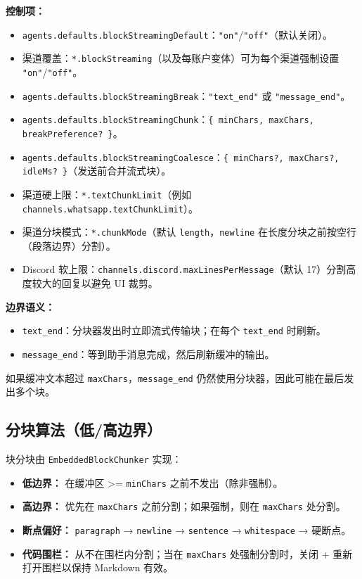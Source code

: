 \textbf{控制项：}

\begin{itemize}
  \item \texttt{agents.defaults.blockStreamingDefault}：\texttt{"on"}/\texttt{"off"}（默认关闭）。
  \item 渠道覆盖：\texttt{*.blockStreaming}（以及每账户变体）可为每个渠道强制设置 \texttt{"on"}/\texttt{"off"}。
  \item \texttt{agents.defaults.blockStreamingBreak}：\texttt{"text\_end"} 或 \texttt{"message\_end"}。
  \item \texttt{agents.defaults.blockStreamingChunk}：\texttt{\{ minChars, maxChars, breakPreference? \}}。
  \item \texttt{agents.defaults.blockStreamingCoalesce}：\texttt{\{ minChars?, maxChars?, idleMs? \}}（发送前合并流式块）。
  \item 渠道硬上限：\texttt{*.textChunkLimit}（例如 \texttt{channels.whatsapp.textChunkLimit}）。
  \item 渠道分块模式：\texttt{*.chunkMode}（默认 \texttt{length}，\texttt{newline} 在长度分块之前按空行（段落边界）分割）。
  \item Discord 软上限：\texttt{channels.discord.maxLinesPerMessage}（默认 17）分割高度较大的回复以避免 UI 裁剪。
\end{itemize}


\textbf{边界语义：}

\begin{itemize}
  \item \texttt{text\_end}：分块器发出时立即流式传输块；在每个 \texttt{text\_end} 时刷新。
  \item \texttt{message\_end}：等到助手消息完成，然后刷新缓冲的输出。
\end{itemize}


如果缓冲文本超过 \texttt{maxChars}，\texttt{message\_end} 仍然使用分块器，因此可能在最后发出多个块。

\subsection{分块算法（低/高边界）}


块分块由 \texttt{EmbeddedBlockChunker} 实现：

\begin{itemize}
  \item \textbf{低边界：} 在缓冲区 >= \texttt{minChars} 之前不发出（除非强制）。
  \item \textbf{高边界：} 优先在 \texttt{maxChars} 之前分割；如果强制，则在 \texttt{maxChars} 处分割。
  \item \textbf{断点偏好：} \texttt{paragraph} → \texttt{newline} → \texttt{sentence} → \texttt{whitespace} → 硬断点。
  \item \textbf{代码围栏：} 从不在围栏内分割；当在 \texttt{maxChars} 处强制分割时，关闭 + 重新打开围栏以保持 Markdown 有效。
\end{itemize}


